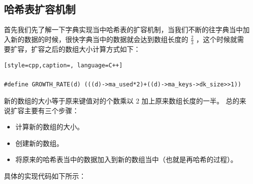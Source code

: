 \subsection{哈希表扩容机制}
首先我们先了解一下字典实现当中哈希表的扩容机制，当我们不断的往字典当中加入新的数据的时候，很快字典当中的数据就会达到数组长度的 $\frac{2}{3}$ ，这个时候就需要扩容，扩容之后的数组大小计算方式如下：
\begin{lstlisting}[style=cpp,caption=, language=C++]

#define GROWTH_RATE(d) (((d)->ma_used*2)+((d)->ma_keys->dk_size>>1))
\end{lstlisting}
新的数组的大小等于原来键值对的个数乘以 2 加上原来数组长度的一半。
总的来说扩容主要有三个步骤：
\begin{itemize}
\item 计算新的数组的大小。 
\item 创建新的数组。 
\item 将原来的哈希表当中的数据加入到新的数组当中（也就是再哈希的过程）。 
\end{itemize}
具体的实现代码如下所示：
